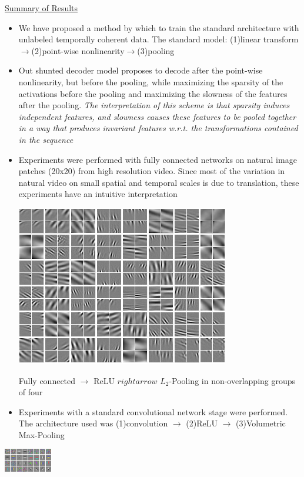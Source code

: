 \documentclass[12pt,a4paper]{report}
\begin{document}
\underline{Summary of Results}  
\noindent 
\begin{itemize} 
\item We have proposed a method by which to train the standard architecture with unlabeled temporally coherent data. The standard model: (1)linear transform $\rightarrow$(2)point-wise nonlinearity$\rightarrow$(3)pooling
\item Out shunted decoder model proposes to decode after the point-wise nonlinearity, but before the pooling, while maximizing the sparsity of the activations before the pooling and maximizing the slowness of the features after the pooling. \emph{The interpretation of this scheme is that sparsity induces independent features, and slowness causes these features to be pooled together in a way that produces invariant features w.r.t. the transformations contained in the sequence}
\item Experiments were performed with fully connected networks on natural image patches (20x20) from high resolution video. Since most of the variation in natural video on small spatial and temporal scales is due to translation, these experiments have an intuitive interpretation 
\begin{center}
\includegraphics[scale=0.4]{SF_pool_SF.png}
\end{center} 
Fully connected $\rightarrow$ ReLU $rightarrow$ $L_2$-Pooling in non-overlapping groups of four 
\item Experiments with a standard convolutional network stage were performed. The architecture used was (1)convolution $\rightarrow$ (2)ReLU $\rightarrow$ (3)Volumetric Max-Pooling
\end{itemize}  
\begin{center}
\includegraphics[scale=2]{dec2.png}
\end{center} 
\end{document}
